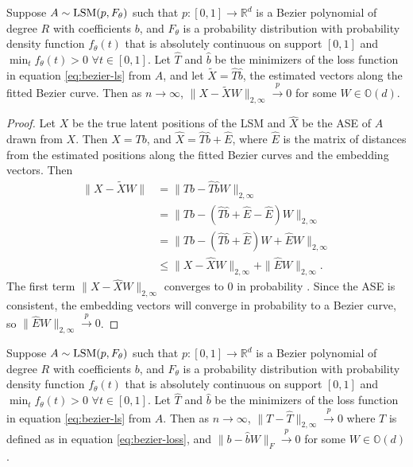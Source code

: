 \documentclass[12pt]{article}
\begin{document}
\begin{lemma}
\label{lem:bezier-consistency}
Suppose $A \sim \mathrm{LSM}(p, F_\theta)$ such that $p : [0, 1] \to \mathbb{R}^d$ is a Bezier polynomial of degree $R$ with coefficients $b$, and $F_\theta$ is a probability distribution with probability density function $f_\theta(t)$ that is absolutely continuous on support $[0, 1]$ and $\min_t f_\theta(t) > 0$ $\forall t \in [0, 1]$. 
Let $\hat{T}$ and $\hat{b}$ be the minimizers of the loss function in equation \ref{eq:bezier-ls} from $A$, and let $\tilde{X} = \hat{T} \hat{b}$, the estimated vectors along the fitted Bezier curve. 
Then as $n \to \infty$, $\|X - \tilde{X} W\|_{2,\infty} \stackrel{p}{\to} 0$ for some $W \in \mathbb{O}(d)$.
\end{lemma}

\begin{proof}
Let $X$ be the true latent positions of the LSM and $\hat{X}$ be the ASE of $A$ drawn from $X$. 
Then $X = T b$, and $\hat{X} = \hat{T} \hat{b} + \hat{E}$, where $\hat{E}$ is the matrix of distances from the estimated positions along the fitted Bezier curves and the embedding vectors. 
Then
$$
\begin{aligned}
\|X - \tilde{X} W\| & = \|T b - \hat{T} \hat{b} W\|_{2,\infty} \\
& = \|T b - (\hat{T} \hat{b} + \hat{E} - \hat{E}) W \|_{2,\infty} \\
& = \|T b - (\hat{T} \hat{b} + \hat{E}) W + \hat{E} W\|_{2,\infty} \\
& \leq \|X - \hat{X} W\|_{2,\infty} + \|\hat{E} W\|_{2,\infty}.
\end{aligned}
$$
The first term $\|X - \hat{X} W\|_{2,\infty}$ converges to $0$ in probability \citep{lyzinski2014}. 
Since the ASE is consistent, the embedding vectors will converge in probability to a Bezier curve, so $\|\hat{E} W\|_{2,\infty} \stackrel{p}{\to} 0$. 
\end{proof}

\begin{theorem}
\label{thm:bezier-consistency}
Suppose $A \sim \mathrm{LSM}(p, F_\theta)$ such that $p : [0, 1] \to \mathbb{R}^d$ is a Bezier polynomial of degree $R$ with coefficients $b$, and $F_\theta$ is a probability distribution with probability density function $f_\theta(t)$ that is absolutely continuous on support $[0, 1]$ and $\min_t f_\theta(t) > 0$ $\forall t \in [0, 1]$. 
Let $\hat{T}$ and $\hat{b}$ be the minimizers of the loss function in equation \ref{eq:bezier-ls} from $A$. 
Then as $n \to \infty$, $\|T - \hat{T}\|_{2, \infty} \stackrel{p}{\to} 0$ where $T$ is defined as in equation \ref{eq:bezier-loss}, and $\|b - \hat{b} W \|_F \stackrel{p}{\to} 0$ for some $W \in \mathbb{O}(d)$.
\end{theorem}
\end{document}
